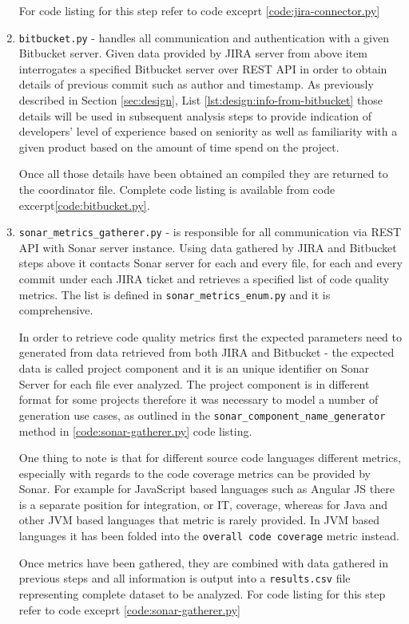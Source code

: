 \begin{enumerate}
    For code listing for this step refer to code exceprt \ref{code:jira-connector.py}
    
    \item\label{lst:impl.item:bitbucket} \texttt{bitbucket.py} - handles all communication and authentication with a given Bitbucket server. Given data provided by JIRA server from above item interrogates a specified Bitbucket server over REST API in order to obtain details of previous commit such as author and timestamp. As previously described in Section \ref{sec:design}, List \ref{lst:design:info-from-bitbucket} those details will be used in subsequent analysis steps to provide indication of developers' level of experience based on seniority as well as familiarity with a given product based on the amount of time spend on the project.
    
    Once all those details have been obtained an compiled they are returned to the coordinator file.
    Complete code listing is available from code excerpt\ref{code:bitbucket.py}.
    
    \item\label{lst:impl.item:sonar-metrics-gatherer} \texttt{sonar\_metrics\_gatherer.py} - is responsible for all communication via REST API with Sonar server instance. Using data gathered by JIRA and Bitbucket steps above it contacts Sonar server for each and every file, for each and every commit under each JIRA ticket and retrieves a specified list of code quality metrics. The list is defined in \texttt{sonar\_metrics\_enum.py} and it is comprehensive. 
    
    In order to retrieve code quality metrics first the expected parameters need to generated from data retrieved from both JIRA and Bitbucket - the expected data is called project component  and it is an unique identifier on Sonar Server for each file ever analyzed. The project component is in different format for some projects therefore it was necessary to model a number of generation use cases, as outlined in the \texttt{sonar\_component\_name\_generator} method in \ref{code:sonar-gatherer.py} code listing.
    
    One thing to note is that for different source code languages different metrics, especially with regards to the code coverage metrics can be provided by Sonar. For example for JavaScript based languages such as Angular JS there is a separate position for integration, or IT, coverage, whereas for Java and other JVM based languages that metric is rarely provided. In JVM based languages it has been folded into the \texttt{overall code coverage} metric instead.
    
    
    Once metrics have been gathered, they are combined with data gathered in previous steps and all information is output into a \texttt{results.csv} file representing complete dataset to be analyzed. For code listing for this step refer to code exceprt \ref{code:sonar-gatherer.py}
\end{enumerate}

